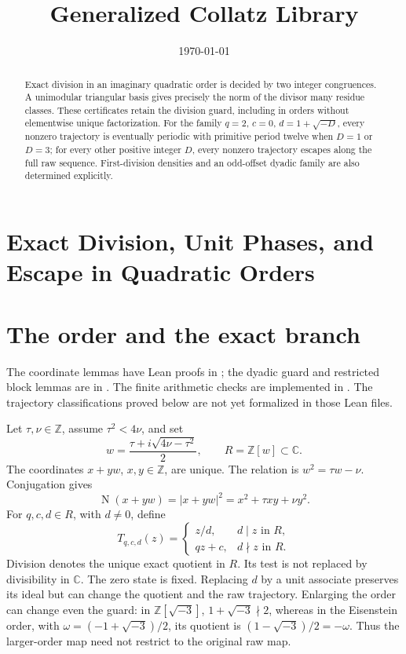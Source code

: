 \documentclass[11pt,letterpaper]{article}
\title{Generalized Collatz Library}
\author{}
\date{\today}
\newcommand{\Z}{\mathbb{Z}}
\newcommand{\C}{\mathbb{C}}
\newcommand{\OrderNorm}{\operatorname{N}}
\newcommand{\RawMap}{T}
\begin{document}
\maketitle
\section*{Exact Division, Unit Phases, and Escape in Quadratic Orders}

\begin{abstract}
Exact division in an imaginary quadratic order is decided by two integer
congruences. A unimodular triangular basis gives precisely the norm of the
divisor many residue classes. These certificates retain the division guard,
including in orders without elementwise unique factorization.
For the family \(q=2\), \(c=0\), \(d=1+\sqrt{-D}\), every nonzero trajectory
is eventually periodic with primitive period twelve when \(D=1\) or \(D=3\);
for every other positive integer \(D\), every nonzero trajectory escapes
along the full raw sequence. First-division densities and an odd-offset
dyadic family are also determined explicitly.
\end{abstract}

\section{The order and the exact branch}

The coordinate lemmas have Lean proofs in \cite{LibraryCoordinates26};
the dyadic guard and restricted block lemmas are in \cite{LibraryDyadic26}.
The finite arithmetic checks are implemented in \cite{LibraryQuadraticChecks26}.
The trajectory classifications proved below are not yet formalized in those Lean files.

Let \(\tau,\nu\in\Z\), assume \(\tau^2<4\nu\), and set
\[
w=\frac{\tau+i\sqrt{4\nu-\tau^2}}2,\qquad
R=\Z[w]\subset\C.
\]
The coordinates \(x+yw\), \(x,y\in\Z\), are unique. The relation is
\(w^2=\tau w-\nu\). Conjugation gives
\[
\OrderNorm(x+yw)=|x+yw|^2=x^2+\tau xy+\nu y^2.
\]
For \(q,c,d\in R\), with \(d\ne0\), define
\[
\RawMap_{q,c,d}(z)=
\begin{cases}
z/d,&d\mid z\text{ in }R,\\
qz+c,&d\nmid z\text{ in }R.
\end{cases}
\]
Division denotes the unique exact quotient in \(R\). Its test is not
replaced by divisibility in \(\C\). The zero state is fixed.
Replacing \(d\) by a unit associate preserves its ideal but can change
the quotient and the raw trajectory. Enlarging the order can change even
the guard: in \(\Z[\sqrt{-3}]\), \(1+\sqrt{-3}\nmid2\), whereas in the
Eisenstein order, with \(\omega=(-1+\sqrt{-3})/2\), its quotient is
\((1-\sqrt{-3})/2=-\omega\). Thus the larger-order map need not restrict
to the original raw map.
\end{document}
